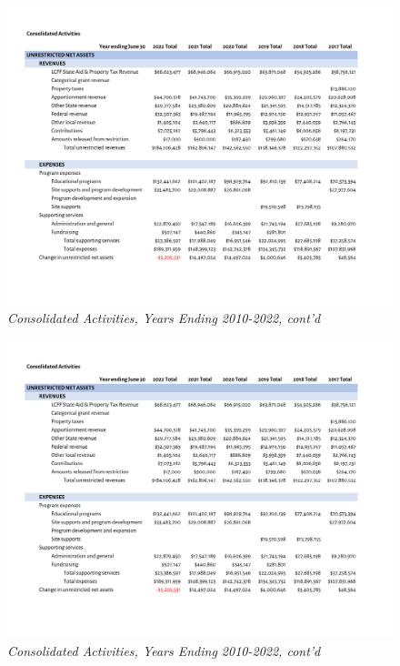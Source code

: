 \begin{figure}
  \caption*{\textit{Consolidated Activities, Years Ending 2010-2022, cont'd}} %
  \includegraphics[page=3,width=0.9\textheight]{Consolidated_Activities_Years_2010-2022} %
\end{figure}

\begin{figure}
  \caption*{\textit{Consolidated Activities, Years Ending 2010-2022, cont'd}} %
  \includegraphics[page=4,width=0.9\textheight]{Consolidated_Activities_Years_2010-2022} %
\end{figure}

